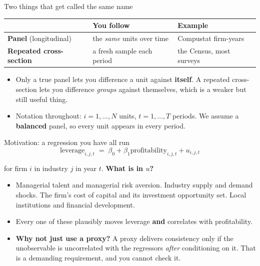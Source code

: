 \documentclass[
  11pt,
  ignorenonframetext,
  aspectratio=169,
]{beamer}
\providecommand{\tightlist}{%
  \setlength{\itemsep}{0pt}\setlength{\parskip}{0pt}}
\begin{document}
\begin{frame}{Two things that get called the same name}
\protect{}\label{two-things-that-get-called-the-same-name}
\begin{center}\small
\begin{tabular}{lll}
\toprule
 & You follow & Example \\
\midrule
\textbf{Panel} (longitudinal) & the \emph{same} units over time & Compustat firm-years \\
\textbf{Repeated cross-section} & a fresh sample each period & the Census, most surveys \\
\bottomrule
\end{tabular}
\end{center}

\begin{itemize}
\tightlist
\item
  Only a true panel lets you difference a unit against \textbf{itself}.
  A repeated cross-section lets you difference \emph{groups} against
  themselves, which is a weaker but still useful thing.
\item
  Notation throughout: \(i = 1, \dots, N\) units, \(t = 1, \dots, T\)
  periods. We assume a \textbf{balanced} panel, so every unit appears in
  every period.
\end{itemize}
\end{frame}

\begin{frame}{Motivation: a regression you have all run}
\protect{}\label{motivation-a-regression-you-have-all-run}
\[
\text{leverage}_{i,j,t} \;=\; \beta_0 + \beta_1 \text{profitability}_{i,j,t} + u_{i,j,t}
\]

for firm \(i\) in industry \(j\) in year \(t\). \textbf{What is in
\(u\)?}

\vspace{0.3em}

\begin{itemize}
\tightlist
\item
  Managerial talent and managerial risk aversion. Industry supply and
  demand shocks. The firm's cost of capital and its investment
  opportunity set. Local institutions and financial development.
\end{itemize}

\vspace{0.3em}

\begin{itemize}
\tightlist
\item
  Every one of these plausibly moves leverage \textbf{and} correlates
  with profitability.
\item
  \textbf{Why not just use a proxy?} A proxy delivers consistency only
  if the unobservable is uncorrelated with the regressors \emph{after}
  conditioning on it. That is a demanding requirement, and you cannot
  check it.
\end{itemize}
\end{frame}
\end{document}
